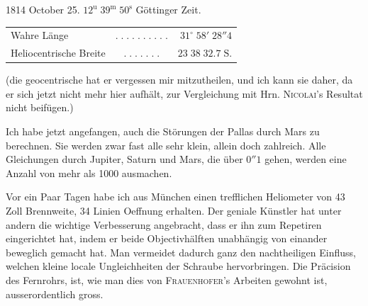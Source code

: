 \begin{center}1814 October 25. $12^{\mathrm u}\;39^{\mathrm m}\;50^{\mathrm s}$ Göttinger Zeit.\end{center}
\begin{center}\fontsize{10}{12}\selectfont\setlength{\tabcolsep}{2pt}\renewcommand{\arraystretch}{1.15}\begin{tabular}{lcr}
Wahre Länge & $.\;.\;.\;.\;.\;.\;.\;.\;.\;.$ & $31^\circ\;58'\;28''4$\\
Heliocentrische Breite & $.\;.\;.\;.\;.\;.\;.$ & $23\;38\;32.7\;\mathrm{S.}$\\
\end{tabular}\end{center}

\noindent (die geocentrische hat er vergessen mir mitzutheilen, und ich kann sie daher, da er sich jetzt
nicht mehr hier aufhält, zur Vergleichung mit Hrn. \textsc{Nicolai}'s Resultat nicht beifügen.)

\par\indent Ich habe jetzt angefangen, auch die Störungen der Pallas durch Mars zu berechnen. Sie werden
zwar fast alle sehr klein, allein doch zahlreich. Alle Gleichungen durch Jupiter, Saturn und
Mars, die über $0''1$ gehen, werden eine Anzahl von mehr als 1000 ausmachen.

\par\indent Vor ein Paar Tagen habe ich aus München einen trefflichen Heliometer von 43 Zoll Brennweite,
34 Linien Oeffnung erhalten. Der geniale Künstler hat unter andern die wichtige Verbesserung
angebracht, dass er ihn zum Repetiren eingerichtet hat, indem er beide Objectivhälften
unabhängig von einander beweglich gemacht hat. Man vermeidet dadurch ganz den nachtheiligen
Einfluss, welchen kleine locale Ungleichheiten der Schraube hervorbringen. Die Präcision des
Fernrohrs, ist, wie man dies von \textsc{Frauenhofer}'s Arbeiten gewohnt ist, ausserordentlich
gross.
